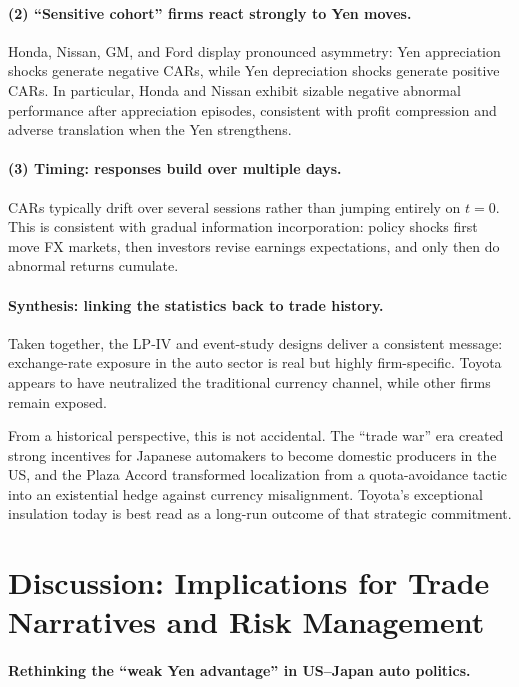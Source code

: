\documentclass[12pt,a4paper]{article}
\begin{document}
\paragraph{(2) ``Sensitive cohort'' firms react strongly to Yen moves.}
Honda, Nissan, GM, and Ford display pronounced asymmetry: Yen appreciation shocks generate negative CARs, while Yen depreciation shocks generate positive CARs. In particular, Honda and Nissan exhibit sizable negative abnormal performance after appreciation episodes, consistent with profit compression and adverse translation when the Yen strengthens.

\paragraph{(3) Timing: responses build over multiple days.}
CARs typically drift over several sessions rather than jumping entirely on $t=0$. This is consistent with gradual information incorporation: policy shocks first move FX markets, then investors revise earnings expectations, and only then do abnormal returns cumulate.

\paragraph{Synthesis: linking the statistics back to trade history.}

Taken together, the LP-IV and event-study designs deliver a consistent message: exchange-rate exposure in the auto sector is real but highly firm-specific. Toyota appears to have neutralized the traditional currency channel, while other firms remain exposed.

From a historical perspective, this is not accidental. The ``trade war'' era created strong incentives for Japanese automakers to become domestic producers in the US, and the Plaza Accord transformed localization from a quota-avoidance tactic into an existential hedge against currency misalignment. Toyota's exceptional insulation today is best read as a long-run outcome of that strategic commitment.

\section{Discussion: Implications for Trade Narratives and Risk Management}

\paragraph{Rethinking the ``weak Yen advantage'' in US--Japan auto politics.}
\end{document}
